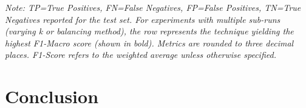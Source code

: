 \documentclass[12pt]{article}
\begin{document}
\begin{table*}[htbp] %
  \centering
  \caption{EFC Performance Summary Across Experiments: Baseline vs. Best Results from Data Balancing, Feature Selection, and Combined Approaches (Selected by F1-Macro).}
  \label{tab:efc_consolidated_results}
  \par\medskip
  \footnotesize
  \textit{Note: TP=True Positives, FN=False Negatives, FP=False Positives, TN=True Negatives reported for the test set.
    For experiments with multiple sub-runs (varying k or balancing method), the row represents the technique yielding the
    highest F1-Macro score (shown in bold). Metrics are rounded to three decimal places. F1-Score refers to the weighted
    average unless otherwise specified.}
\end{table*}

\section{Conclusion} \label{section:conclusion}
\end{document}
